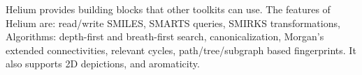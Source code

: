 Helium provides building blocks that other toolkits can use. The features of Helium are: read/write SMILES, SMARTS queries, SMIRKS transformations, Algorithms: depth-first and breath-first search, canonicalization, Morgan's extended connectivities, relevant cycles, path/tree/subgraph based fingerprints. It also supports 2D depictions, and aromaticity.
